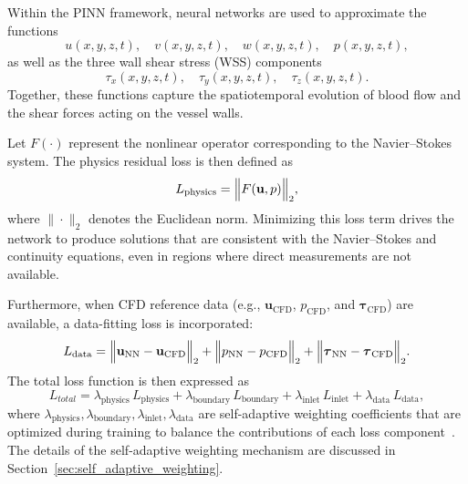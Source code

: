 \documentclass[12pt, a4paper]{article}
\begin{document}
Within the PINN framework, neural networks are used to approximate the functions
\[
u(x,y,z,t),\quad v(x,y,z,t),\quad w(x,y,z,t),\quad p(x,y,z,t),
\]
as well as the three wall shear stress (WSS) components
\[
\tau_x(x,y,z,t),\quad \tau_y(x,y,z,t),\quad \tau_z(x,y,z,t).
\]
Together, these functions capture the spatiotemporal evolution of blood flow and the shear forces acting on the vessel walls.

Let \(F(\cdot)\) represent the nonlinear operator corresponding to the Navier–Stokes system. The physics residual loss is then defined as
\[
L_{\mathrm{physics}} = \Bigl\|F(\mathbf{u},p)\Bigr\|_2,
\]
where \(\|\cdot\|_2\) denotes the Euclidean norm. Minimizing this loss term drives the network to produce solutions that are consistent with the Navier–Stokes and continuity equations, even in regions where direct measurements are not available.

Furthermore, when CFD reference data (e.g., \(\mathbf{u}_{\mathrm{CFD}}\), \(p_{\mathrm{CFD}}\), and \(\boldsymbol{\tau}_{\mathrm{CFD}}\)) are available, a data-fitting loss is incorporated:
\[
L_{\mathrm{data}} = \Bigl\|\mathbf{u}_{\mathrm{NN}} - \mathbf{u}_{\mathrm{CFD}}\Bigr\|_2 + \Bigl\|p_{\mathrm{NN}} - p_{\mathrm{CFD}}\Bigr\|_2 + \Bigl\|\boldsymbol{\tau}_{\mathrm{NN}} - \boldsymbol{\tau}_{\mathrm{CFD}}\Bigr\|_2.
\]
The total loss function is then expressed as
\begin{equation}
L_{total} = \lambda_{\mathrm{physics}}\,L_{\mathrm{physics}} + \lambda_{\mathrm{boundary}}\,L_{\mathrm{boundary}} + \lambda_{\mathrm{inlet}}\,L_{\mathrm{inlet}} + \lambda_{\mathrm{data}}\,L_{\mathrm{data}},
\label{eq:total_loss}
\end{equation}
where \(\lambda_{\mathrm{physics}}, \lambda_{\mathrm{boundary}}, \lambda_{\mathrm{inlet}}, \lambda_{\mathrm{data}}\) are self-adaptive weighting coefficients that are optimized during training to balance the contributions of each loss component~\citep{mcclenny2020self}. The details of the self-adaptive weighting mechanism are discussed in Section~\ref{sec:self_adaptive_weighting}.



\end{document}
